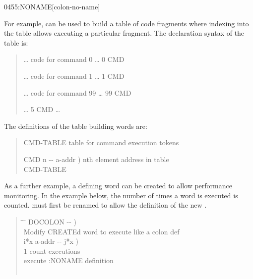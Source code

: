 \begin{worddef}{0455}{:NONAME}[colon-no-name]
\begin{defer}
		For example,  can be used to build a table of
		code fragments where indexing into the table allows executing
		a particular fragment. The declaration syntax of the table is:

		\begin{quote}\ttfamily
			 {\ldots} code for command 0 {\ldots} \word{;}
			0 CMD \word{!}

			 {\ldots} code for command 1 {\ldots} \word{;}
			1 CMD \word{!}

			\tab {\ldots}

			 {\ldots} code for command 99 {\ldots} \word{;}
			99 CMD \word{!}

			{\ldots} 5 CMD   {\ldots}
		\end{quote}

		The definitions of the table building words are:

		\begin{quote}\ttfamily
			 CMD-TABLE
				 table for command execution tokens \\
			  

			\word{:} CMD  n -{}- a-addr )
				 nth element address in table \\
			\tab {} CMD-TABLE \word{+}
			\word{;}
		\end{quote}

		As a further example, a defining word can be created to allow
		performance monitoring. In the example below, the number of
		times a word is executed is counted. \word{:} must first be
		renamed to allow the definition of the new \word{;}.

		\begin{quote}\ttfamily
		  \begin{tabbing}
			\tab \= \tab \= \hspace*{12em} \= \kill
			\word{:} DOCOLON  -{}- ) \\
			\+  Modify CREATEd word to execute like a colon def \\
				\+   i*x a-addr -{}- j*x ) \\
					1  \word{+!}								\>  count executions \\
			\-	\-	  				\>  execute :NONAME definition \\
			\word{;} \\[1.5\parskip]


\end{tabbing}
\end{quote}
\end{defer}
\end{worddef}
